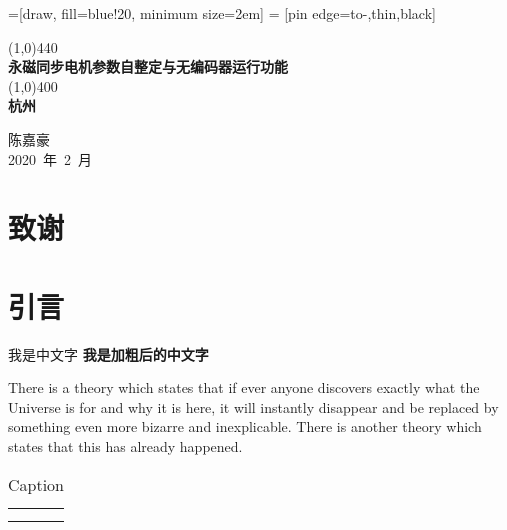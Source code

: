 \documentclass[10pt,a4paper]{article} %
\begin{document}
%
=[draw, fill=blue!20, minimum size=2em]
 = [pin edge={to-,thin,black}]

\begin{titlepage}
    \begin{center}
        \line(1,0){440}\\
        [0.25in]
        \huge{\bfseries 永磁同步电机参数自整定与无编码器运行功能}\\
        [2mm]
        \line(1,0){400}\\
        [1.5cm]
        \textsc{\LARGE \bfseries 杭州}\\
        [10cm]
    \end{center}
    \begin{flushright}
    \textsc{\Large 陈嘉豪\\2020~年~2~月}
    \end{flushright}
\end{titlepage}

\section*{致谢}
\cleardoublepage

\renewcommand{\contentsname}{目录}
\tableofcontents
\thispagestyle{empty}
\cleardoublepage
\setcounter{page}{1}

\section{引言}\label{sec:intro}
我是中文字
{\bfseries 我是加粗后的中文字}

There is a theory which states that if ever anyone discovers exactly what the Universe is for and why it is here, it will instantly disappear and be replaced by something even more bizarre and inexplicable.
There is another theory which states that this has already happened.


\begin{table}[H]
    \centering
    \begin{tabular}{c|c}
         &  \\
         &
    \end{tabular}
    \caption{Caption}
    \label{tab:motor_performance}
\end{table}
\end{document}
